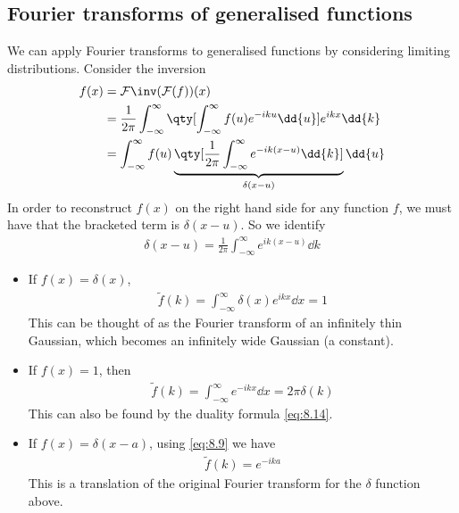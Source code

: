 \subsection{Fourier transforms of generalised functions}
We can apply Fourier transforms to generalised functions by considering limiting distributions.
Consider the inversion
\begin{align*}
	f(x) & = \mathcal F\inv(\mathcal F(f))(x) \\
	     & = \frac{1}{2\pi} \int_{-\infty}^\infty \qty[\int_{-\infty}^\infty f(u) e^{-iku} \dd{u}] e^{ikx} \dd{k} \\
	     & = \int_{-\infty}^\infty f(u) \underbrace{\qty[\frac{1}{2\pi} \int_{-\infty}^\infty e^{-ik(x-u)} \dd{k}]}_{\delta(x-u)} \dd{u}
\end{align*}
In order to reconstruct $f(x)$ on the right hand side for any function $f$, we must have that the bracketed term is $\delta(x-u)$.
So we identify
\begin{align*}
	\delta(x-u) = \frac{1}{2\pi} \int_{-\infty}^\infty e^{ik(x-u)} \dd{k}
\end{align*}
\begin{itemize}
	\item If $f(x) = \delta(x)$,
	\begin{align} \label{eq:8.21}
		\widetilde f(k) = \int_{-\infty}^\infty \delta(x) e^{ikx} \dd{x} = 1
	\end{align}
	This can be thought of as the Fourier transform of an infinitely thin Gaussian, which becomes an infinitely wide Gaussian (a constant).
	\item If $f(x) = 1$, then
	\begin{align} \label{eq:8.22}
		\widetilde f(k) = \int_{-\infty}^\infty e^{-ikx}\dd{x} = 2\pi \delta(k)
	\end{align}
	This can also be found by the duality formula \cref{eq:8.14}.
	\item If $f(x) = \delta(x - a)$, using \cref{eq:8.9} we have
	\begin{align} \label{eq:8.23}
		\widetilde f(k) = e^{-ika}
	\end{align}
	This is a translation of the original Fourier transform for the $\delta$ function above.
\end{itemize}

